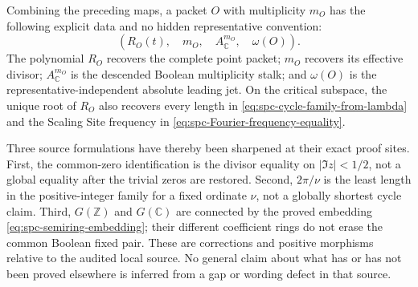 Combining the preceding maps, a packet \(O\) with multiplicity \(m_O\) has
the following explicit data and no hidden representative convention:
\begin{equation}
\label{eq:spc-weighted-spectral-packet}
 \left(
   R_O(t),\quad
   m_O,\quad
   A_{\mathbb C}^{m_O},\quad
   \omega(O)
 \right).
\end{equation}
The polynomial \(R_O\) recovers the complete point packet; \(m_O\) recovers
its effective divisor; \(A_{\mathbb C}^{m_O}\) is the descended Boolean
multiplicity stalk; and \(\omega(O)\) is the representative-independent
absolute leading jet.  On the critical subspace, the unique root of \(R_O\)
also recovers every length in \eqref{eq:spc-cycle-family-from-lambda} and the
Scaling Site frequency in \eqref{eq:spc-Fourier-frequency-equality}.

Three source formulations have thereby been sharpened at their exact proof
sites.  First, the common-zero identification is the divisor equality on
\(|\Im z|<1/2\), not a global equality after the trivial zeros are restored.
Second, \(2\pi/\nu\) is the least length in the positive-integer family for a
fixed ordinate \(\nu\), not a globally shortest cycle claim.  Third,
\(G(\mathbb Z)\) and \(G(\mathbb C)\) are connected by the proved embedding
\eqref{eq:spc-semiring-embedding}; their different coefficient rings do not
erase the common Boolean fixed pair.  These are corrections and positive
morphisms relative to the audited local source.  No general claim about what
has or has not been proved elsewhere is inferred from a gap or wording defect
in that source.
